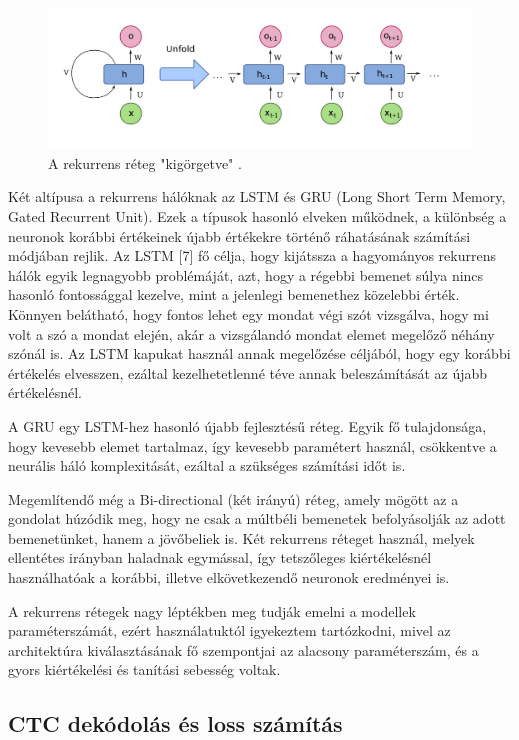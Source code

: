 \begin{figure}[!ht]
\centering
\includegraphics[width=140mm, keepaspectratio]{figures/rnn.png}
\caption{A rekurrens réteg "kigörgetve" \cite{rnn}.}
\end{figure}

Két altípusa a rekurrens hálóknak az LSTM és GRU (Long Short Term Memory, Gated Recurrent Unit). Ezek a típusok hasonló elveken működnek, a különbség a neuronok korábbi értékeinek újabb értékekre történő ráhatásának számítási módjában rejlik. Az LSTM [7] fő célja, hogy kijátssza a hagyományos rekurrens hálók egyik legnagyobb problémáját, azt, hogy a régebbi bemenet súlya nincs hasonló fontossággal kezelve, mint a jelenlegi bemenethez közelebbi érték. Könnyen belátható, hogy fontos lehet egy mondat végi szót vizsgálva, hogy mi volt a szó a mondat elején, akár a vizsgálandó mondat elemet megelőző néhány szónál is. Az LSTM kapukat használ annak megelőzése céljából, hogy egy korábbi értékelés elvesszen, ezáltal kezelhetetlenné téve annak beleszámítását az újabb értékelésnél.

A GRU egy LSTM-hez hasonló újabb fejlesztésű réteg. Egyik fő tulajdonsága, hogy kevesebb elemet tartalmaz, így kevesebb paramétert használ, csökkentve a neurális háló komplexitását, ezáltal a szükséges számítási időt is.

Megemlítendő még a Bi-directional (két irányú) réteg, amely mögött az a gondolat húzódik meg, hogy ne csak a múltbéli bemenetek befolyásolják az adott bemenetünket, hanem a jövőbeliek is. Két rekurrens réteget használ, melyek ellentétes irányban haladnak egymással, így tetszőleges kiértékelésnél használhatóak a korábbi, illetve elkövetkezendő neuronok eredményei is.

A rekurrens rétegek nagy léptékben meg tudják emelni a modellek paraméterszámát, ezért használatuktól igyekeztem tartózkodni, mivel az architektúra kiválasztásának fő szempontjai az alacsony paraméterszám, és a gyors kiértékelési és tanítási sebesség voltak.

\subsection{CTC dekódolás és loss számítás}

